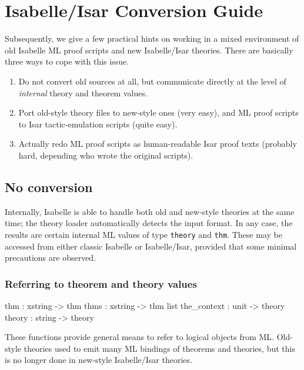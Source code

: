 
\chapter{Isabelle/Isar Conversion Guide}\label{ap:conv}

Subsequently, we give a few practical hints on working in a mixed environment
of old Isabelle ML proof scripts and new Isabelle/Isar theories.  There are
basically three ways to cope with this issue.
\begin{enumerate}
\item Do not convert old sources at all, but communicate directly at the level
  of \emph{internal} theory and theorem values.
\item Port old-style theory files to new-style ones (very easy), and ML proof
  scripts to Isar tactic-emulation scripts (quite easy).
\item Actually redo ML proof scripts as human-readable Isar proof texts
  (probably hard, depending who wrote the original scripts).
\end{enumerate}


\section{No conversion}

Internally, Isabelle is able to handle both old and new-style theories at the
same time; the theory loader automatically detects the input format.  In any
case, the results are certain internal ML values of type \texttt{theory} and
\texttt{thm}.  These may be accessed from either classic Isabelle or
Isabelle/Isar, provided that some minimal precautions are observed.


\subsection{Referring to theorem and theory values}

\begin{ttbox}
thm         : xstring -> thm
thms        : xstring -> thm list
the_context : unit -> theory
theory      : string -> theory
\end{ttbox}

These functions provide general means to refer to logical objects from ML.
Old-style theories used to emit many ML bindings of theorems and theories, but
this is no longer done in new-style Isabelle/Isar theories.

